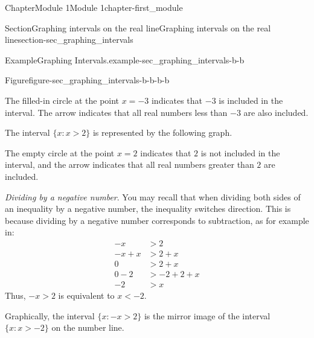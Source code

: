 \documentclass[oneside,10pt,]{book}
\newcommand{\lt}{<}
\begin{document}
\begin{chapterptx}{Chapter}{Module 1}{}{Module 1}{}{}{chapter-first_module}
\begin{sectionptx}{Section}{Graphing intervals on the real line}{}{Graphing intervals on the real line}{}{}{section-sec_graphing_intervals}
\begin{introduction}{}
\begin{example}{Example}{Graphing Intervals.}{example-sec_graphing_intervals-b-b}
\begin{figureptx}{Figure}{}{figure-sec_graphing_intervals-b-b-b-b}{}
\tcblower
\end{figureptx}%
The filled-in circle at the point \(x=-3\) indicates that \(-3\) is included in the interval.  The arrow indicates that all real numbers less than \(-3\) are also included.%
\par
The interval \(\{ x: x > 2 \}\) is represented by the following graph.%
\begin{image}{0}{1}{0}{}%
%
\end{image}%
The empty circle at the point \(x=2\) indicates that \(2\) is not included in the interval, and the arrow indicates that all real numbers greater than \(2\) are included.%
\end{example}
\emph{Dividing by a negative number}.  You may recall that when dividing both sides of an inequality by a negative number, the inequality switches direction.  This is because dividing by a negative number corresponds to subtraction, as for example in:%
%
\begin{equation*}
\begin{aligned}
-x &> 2 \\
-x+x &> 2 + x \\
0 &> 2+x \\
0 - 2 &> -2+2+x \\
-2 &> x
\end{aligned}
\end{equation*}
Thus, \(-x>2\) is equivalent to \(x\lt -2\).%
\par
Graphically, the interval \(\{x : -x > 2\}\) is the mirror image of the interval \(\{x:x>-2\}\) on the number line.%
\begin{image}{0}{1}{0}{}%
\end{image}
\end{introduction}
\end{sectionptx}
\end{chapterptx}
\end{document}
